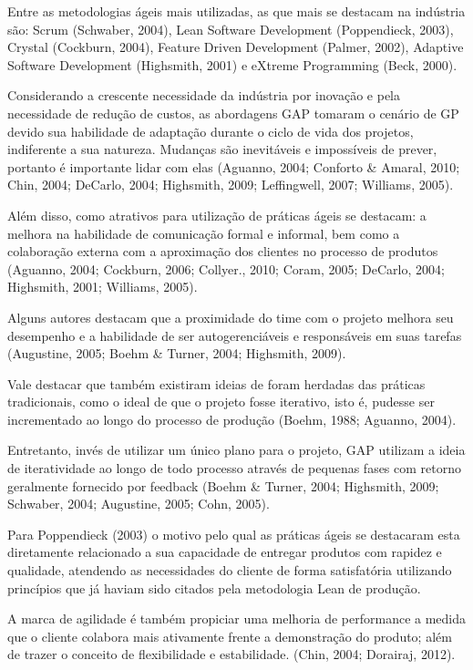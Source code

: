 Entre as metodologias ágeis mais utilizadas, as que mais se destacam na indústria são: Scrum (Schwaber, 2004), Lean Software Development (Poppendieck, 2003), Crystal (Cockburn, 2004), Feature Driven Development (Palmer, 2002), Adaptive Software Development (Highsmith, 2001) e eXtreme Programming (Beck, 2000).

Considerando a crescente necessidade da indústria por inovação e pela necessidade de redução de custos, as abordagens GAP tomaram o cenário de GP devido sua habilidade de adaptação durante o ciclo de vida dos projetos, indiferente a sua natureza. Mudanças são inevitáveis e impossíveis de prever, portanto é importante lidar com elas (Aguanno, 2004; Conforto \& Amaral, 2010; Chin, 2004; DeCarlo, 2004; Highsmith, 2009; Leffingwell, 2007; Williams, 2005).

Além disso, como atrativos para utilização de práticas ágeis se destacam: a melhora na habilidade de comunicação formal e informal, bem como a colaboração externa com a aproximação dos clientes no processo de produtos (Aguanno, 2004; Cockburn, 2006; Collyer., 2010; Coram, 2005; DeCarlo, 2004; Highsmith, 2001; Williams, 2005).

Alguns autores destacam que a proximidade do time com o projeto melhora seu desempenho e a habilidade de ser autogerenciáveis e responsáveis em suas tarefas (Augustine, 2005; Boehm \& Turner, 2004; Highsmith, 2009).

Vale destacar que também existiram ideias de foram herdadas das práticas tradicionais, como o ideal de que o projeto fosse iterativo, isto é, pudesse ser incrementado ao longo do processo de produção (Boehm, 1988; Aguanno, 2004).

Entretanto, invés de utilizar um único plano para o projeto, GAP utilizam a ideia de iteratividade ao longo de todo processo através de pequenas fases com retorno geralmente fornecido por feedback (Boehm \& Turner, 2004; Highsmith, 2009; Schwaber, 2004; Augustine, 2005; Cohn, 2005).

Para Poppendieck (2003) o motivo pelo qual as práticas ágeis se destacaram esta diretamente relacionado a sua capacidade de entregar produtos com rapidez e qualidade, atendendo as necessidades do cliente de forma satisfatória utilizando princípios que já haviam sido citados pela metodologia Lean de produção.

 A marca de agilidade é também propiciar uma melhoria de performance a medida que o cliente colabora mais ativamente frente a demonstração do produto; além de trazer o conceito de flexibilidade e estabilidade. (Chin, 2004; Dorairaj, 2012).

